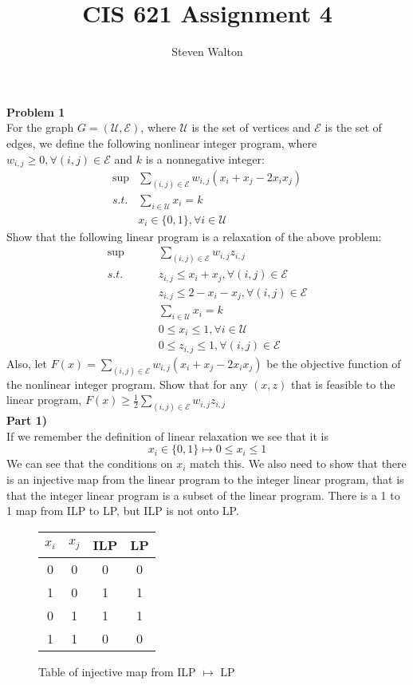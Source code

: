 \documentclass[12pt,letter]{article}
\newcommand{\problem}[1]{\vspace{3mm}\Large\textbf{{Problem {#1}\vspace{3mm}}}\normalsize\\}
\newcommand{\ppart}[1]{\vspace{2mm}\large\textbf{\\Part {#1})\vspace{2mm}}\normalsize\\}
\begin{document}
\title{CIS 621 Assignment 4}
\author{Steven Walton}
\maketitle
\problem{1}
For the graph $G=(\mathcal{U},\mathcal{E})$, where $\mathcal{U}$ is the set of 
vertices and $\mathcal{E}$ is the set of edges, we define the following
nonlinear integer program, where $w_{i,j}\geq0, \forall(i,j)\in\mathcal{E}$ and 
$k$ is a nonnegative integer:
\begin{align*}
    \sup&\sum\limits_{(i,j)\in\mathcal{E}} w_{i,j}(x_i + x_j - 2x_ix_j)\\
    s.t. & \sum\limits_{i\in\mathcal{U}}x_i = k\\
       & x_i\in\{0,1\}, \forall i \in\mathcal{U}
\end{align*}
Show that the following linear program is a relaxation of the above problem:
\begin{align*}
    \sup&\sum\limits_{(i,j)\in\mathcal{E}} w_{i,j}z_{i,j}\\
     s.t.\hspace{1cm} & z_{i,j}\leq x_i + x_j, \forall(i,j)\in\mathcal{E}\\
     & z_{i,j}\leq 2 - x_i - x_j, \forall(i,j) \in \mathcal{E}\\
     & \sum\limits_{i\in\mathcal{U}}x_i = k\\
     & 0 \leq x_i \leq 1, \forall i \in\mathcal{U}\\
     & 0 \leq z_{i,j} \leq 1, \forall(i,j)\in\mathcal{E}
\end{align*}
Also, let $F(x)=\sum\limits_{(i,j)\in\mathcal{E}}w_{i,j}(x_i + x_j - 2x_ix_j)$ be
the objective function of the nonlinear integer program. Show that for any 
$(x,z)$ that is feasible to the linear program, 
$F(x)\geq\frac12\sum\limits_{(i,j)\in\mathcal{E}}w_{i,j}z_{i,j}$
\ppart{1}
If we remember the definition of linear relaxation we see that it is
\[
    x_i\in\{0,1\} \mapsto 0\leq x_i \leq 1
\]
We can see that the conditions on $x_i$ match this. We also need to show that 
there is an injective map from the linear program to the integer linear program,
that is that the integer linear program is a subset of the linear program. There
is a 1 to 1 map from ILP to LP, but ILP is not onto LP.
\begin{figure*}[h]
\begin{center}
\begin{tabular}{|c | c | c | c|}
    \hline
    $x_i$ & $x_j$ & ILP & LP\\
    \hline
    0     &  0    &  0  & 0 \\
    \hline
    1     &  0    &  1  & 1 \\
    \hline
    0     &  1    &  1  & 1 \\
    \hline
    1     &  1    &  0  & 0\\
    \hline
\end{tabular}
\end{center}
    \caption{Table of injective map from ILP $\mapsto$ LP}
\end{figure*}
\end{document}

